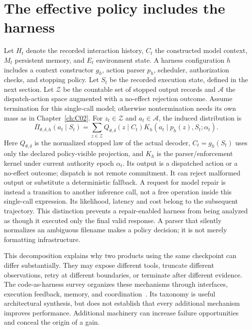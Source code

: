 \section{The effective policy includes the harness}\label{sec:C20:policy}
Let $H_t$ denote the recorded interaction history, $C_t$ the constructed model context, $M_t$ persistent memory, and $E_t$ environment state. A harness configuration $h$ includes a context constructor $g_h$, action parser $p_h$, scheduler, authorization checks, and stopping policy. Let $S_t$ be the recorded execution state, defined in the next section. Let $\mathcal Z$ be the countable set of stopped output records and $\mathcal A$ the dispatch-action space augmented with a no-effect rejection outcome. Assume termination for this single-call model; otherwise nontermination needs its own mass as in Chapter~\ref{ch:C02}. For $z_t\in\mathcal Z$ and $a_t\in\mathcal A$, the induced distribution is
\begin{equation}
 \overline\Pi_{\theta,\delta,h}(a_t\mid S_t)=\sum_{z\in\mathcal Z}
 Q_{\theta,\delta}(z\mid C_t)
 K_h(a_t\mid p_h(z),S_t;\alpha_t).
\end{equation}
Here $Q_{\theta,\delta}$ is the normalized stopped law of the actual decoder, $C_t=g_h(S_t)$ uses only the declared policy-visible projection, and $K_h$ is the parser/enforcement kernel under current authority epoch $\alpha_t$. Its output is a dispatched action or a no-effect outcome; dispatch is not remote commitment. It can reject malformed output or substitute a deterministic fallback. A request for model repair is instead a transition to another inference call, not a free operation inside this single-call expression. Its likelihood, latency and cost belong to the subsequent trajectory. This distinction prevents a repair-enabled harness from being analyzed as though it executed only the final valid response. A parser that silently normalizes an ambiguous filename makes a policy decision; it is not merely formatting infrastructure.

This decomposition explains why two products using the same checkpoint can differ substantially. They may expose different tools, truncate different observations, retry at different boundaries, or terminate after different evidence. The code-as-harness survey organizes these mechanisms through interfaces, execution feedback, memory, and coordination~\cite{corpus260518747}. Its taxonomy is useful architectural synthesis, but does not establish that every additional mechanism improves performance. Additional machinery can increase failure opportunities and conceal the origin of a gain.

